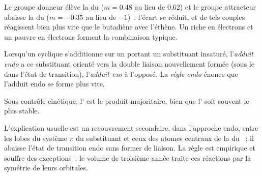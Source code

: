 Le groupe donneur élève la  du  ($m = 0.48$ au lieu de 0.62) et le groupe attracteur
abaisse la  du  ($m = -0.35$ au lieu de $-1$)~: l'écart se réduit, et de tels
couples réagissent bien plus vite que le butadiène avec l'éthène. Un  riche en électrons et un
 pauvre en électrons forment la combinaison typique.

\begin{definition}\label{def:b2:frontier-orbitals:endo}
Lorsqu'un  cyclique s'additionne sur un  portant un substituant insaturé, l'\emph{adduit
endo} a ce substituant orienté vers la double liaison nouvellement
formée (sous le  dans l'état de transition), l'\emph{adduit
exo} à l'opposé. La \emph{règle endo} énonce
que l'adduit endo se forme plus vite.
\end{definition}

\begin{proposition}\label{prop:b2:frontier-orbitals:endo}
Sous contrôle cinétique, l' est le produit majoritaire, bien que l'
soit souvent le plus stable.
\end{proposition}

\admitted

L'explication usuelle est un recouvrement secondaire, dans l'approche endo, entre les
lobes du système $\pi$ du substituant et ceux des atomes centraux de la 
du ~; il abaisse l'état de transition endo sans former de liaison. La règle est
empirique et souffre des exceptions~; le volume de troisième année traite ces réactions par la
symétrie de leurs orbitales.

